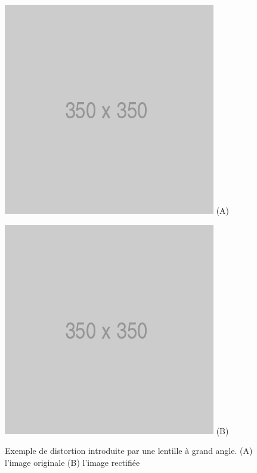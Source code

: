 \begin{figure}[htp]
  \centering
  \begin{minipage}{0.4\textwidth}
    \centering
    \includegraphics[width=\linewidth]{images/placeholder.png}
    (A)
  \end{minipage}
  \begin{minipage}{0.4\textwidth}
    \centering
    \includegraphics[width=\linewidth]{images/placeholder.png}
    (B)
  \end{minipage}
  \caption{Exemple de distortion introduite par une lentille à grand angle. (A) l'image originale (B) l'image rectifiée}
  \label{fig:distortion}
\end{figure}

